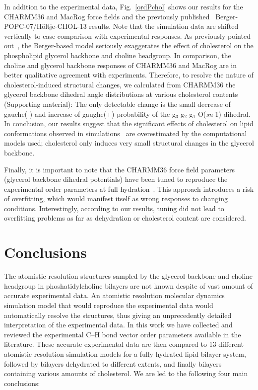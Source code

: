 \documentclass[journal=jacsat,manuscript=article]{achemso}
\begin{document}
In addition to the experimental data, Fig.~\ref{ordPchol} shows
our results for the CHARMM36 and MacRog force fields
and the previously published~\cite{ferreira13}
Berger-POPC-07/H\"oltje-CHOL-13 results.
Note that the simulation data are shifted vertically to ease comparison with experimental responses.
As previously pointed out~\cite{ferreira13}, the Berger-based model
seriously exaggerates the effect of cholesterol on the phospholipid glycerol backbone and choline headgroup.
In comparison, the choline and glycerol backbone responses of CHARMM36 and MacRog are in better qualitative 
agreement with experiments. 
Therefore, to resolve the nature of cholesterol-induced structural changes,
we calculated from CHARMM36 the glycerol backbone dihedral angle distributions
at various cholesterol contents (Supporting material): The only detectable change
is the small decrease of gauche(-) and increase of gaughe(+) probability of the g$_3$-g$_2$-g$_1$-O(\textit{sn}-1) dihedral.
In conclusion, our results suggest that the significant effects of cholesterol on lipid conformations observed in simulations~\cite{zhu07,rog09,alwarawrah12} are overestimated by the computational models used;
cholesterol only induces very small structural changes in the glycerol backbone.

Finally, it is important to note that the CHARMM36 force field parameters (glycerol backbone dihedral potentials)
have been tuned to reproduce the experimental order parameters at full hydration~\cite{klauda10}. 
This approach introduces a risk of overfitting, which would manifest itself as wrong responses to changing conditions. 
Interestingly, according to our results, tuning did not lead to overfitting problems as far as dehydration or cholesterol content are considered. 


\pagebreak
\section{Conclusions}
The atomistic resolution structures sampled by the glycerol backbone and choline headgroup
in phoshatidylcholine bilayers are not known despite of vast amount of accurate experimental
data. An atomistic resolution molecular dynamics simulation model that would reproduce the
experimental data would automatically resolve the structures, thus giving an unprecedently detailed interpretation of the experimental data.
In this work we have collected and reviewed the experimental C--H bond vector order
parameters available in the literature. These accurate experimental data are then compared to 13
different atomistic resolution simulation models for a fully hydrated lipid bilayer system, followed by bilayers dehydrated to different extents, and
finally bilayers containing various amounts of cholesterol. We are led to the following four main conclusions:
\end{document}
